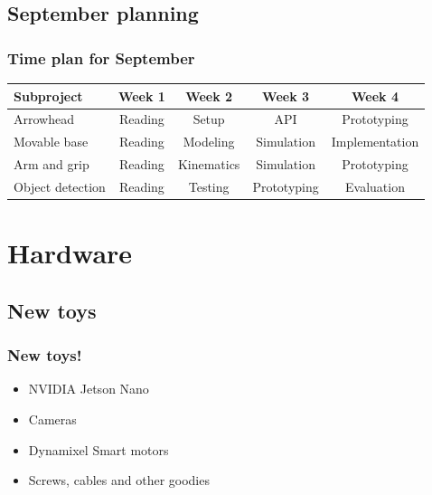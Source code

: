 \documentclass{beamer}
\begin{document}
\subsection{September planning}
\begin{frame}
    \frametitle{Time plan for September}
    \begin{table}
        \begin{tabular}{l | c | c | c | c }
        Subproject & Week 1 & Week 2 & Week 3 & Week 4 \\
        \hline \hline
            Arrowhead & Reading& Setup & API & Prototyping\\
            Movable base & Reading& Modeling & Simulation & Implementation\\
            Arm and grip  & Reading & Kinematics & Simulation& Prototyping\\
            Object detection & Reading & Testing & Prototyping & Evaluation\\
        \end{tabular}
    \end{table}
\end{frame}

\section{Hardware}
\begin{frame}
    \subsection{New toys}
    \frametitle{New toys!} 
    \begin{itemize}
        \item NVIDIA Jetson Nano
        \item Cameras
        \item Dynamixel Smart motors
        \item Screws, cables and other goodies
    \end{itemize} 
\end{frame}
\end{document}
